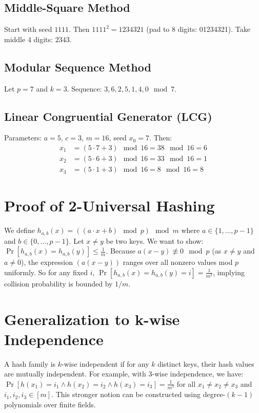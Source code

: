 \documentclass[11pt]{article}
\begin{document}
\subsection{Middle-Square Method}
Start with seed $1111$. Then $1111^2 = 1234321$ (pad to 8 digits: 01234321). Take middle 4 digits: $2343$.

\subsection{Modular Sequence Method}
Let $p = 7$ and $k = 3$. Sequence: $3, 6, 2, 5, 1, 4, 0 \mod 7$.

\subsection{Linear Congruential Generator (LCG)}
Parameters: $a = 5$, $c = 3$, $m = 16$, seed $x_0 = 7$. Then:
\begin{align*}
x_1 &= (5 \cdot 7 + 3) \mod 16 = 38 \mod 16 = 6 \\
x_2 &= (5 \cdot 6 + 3) \mod 16 = 33 \mod 16 = 1 \\
x_3 &= (5 \cdot 1 + 3) \mod 16 = 8 \mod 16 = 8
\end{align*}

\section{Proof of 2-Universal Hashing}
We define $h_{a,b}(x) = ((a \cdot x + b) \mod p) \mod m$ where $a \in \{1,\ldots,p-1\}$ and $b \in \{0,\ldots,p-1\}$. 
Let $x \neq y$ be two keys. We want to show: $\Pr[h_{a,b}(x) = h_{a,b}(y)] \leq \frac{1}{m}$.
Because $a(x - y) \not\equiv 0 \mod p$ (as $x \neq y$ and $a \neq 0$), the expression $(a(x-y))$ ranges over all nonzero values mod $p$ uniformly.
So for any fixed $i$, $\Pr[h_{a,b}(x) = h_{a,b}(y) = i] = \frac{1}{m^2}$, implying collision probability is bounded by $1/m$.

\section{Generalization to k-wise Independence}
A hash family is $k$-wise independent if for any $k$ distinct keys, their hash values are mutually independent.
For example, with 3-wise independence, we have: $\Pr[h(x_1)=i_1 \wedge h(x_2)=i_2 \wedge h(x_3)=i_3] = \frac{1}{m^3}$ for all $x_1 \neq x_2 \neq x_3$ and $i_1,i_2,i_3 \in [m]$.
This stronger notion can be constructed using degree-$(k-1)$ polynomials over finite fields.
\end{document}
